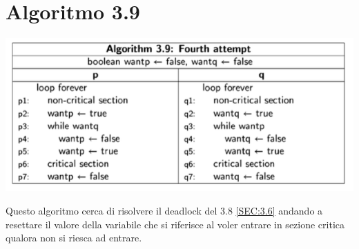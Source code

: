 \documentclass[a4paper]{article}
\begin{document}
\newpage
\section{Algoritmo 3.9}
\label{SEC:3.9}
\begin{center}\includegraphics[width=1\textwidth]{3.9.png}\end{center}
Questo algoritmo cerca di risolvere il deadlock del 3.8 \ref{SEC:3.6} andando a resettare il valore della variabile che si riferisce al voler entrare in sezione critica qualora non si riesca ad entrare.
\end{document}
